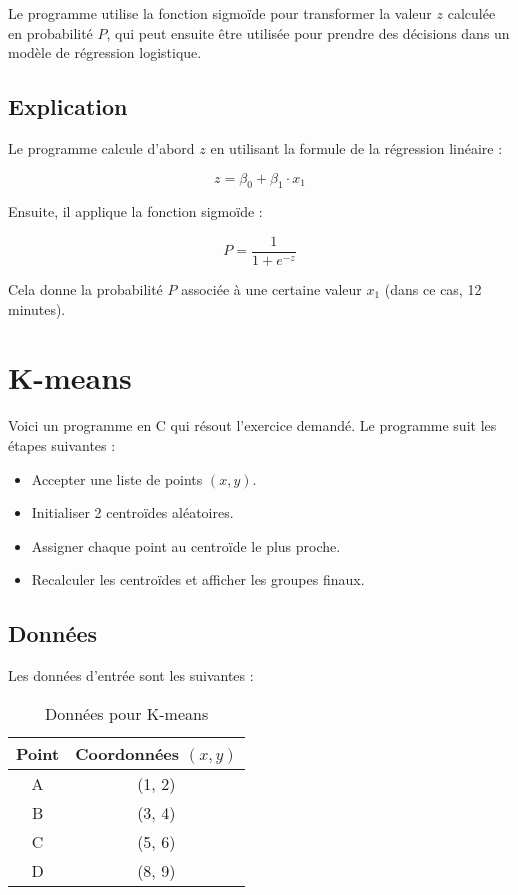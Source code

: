 Le programme utilise la fonction sigmoïde pour transformer la valeur \( z \) calculée en probabilité \( P \), qui peut ensuite être utilisée pour prendre des décisions dans un modèle de régression logistique.

\subsection*{Explication}

Le programme calcule d'abord \( z \) en utilisant la formule de la régression linéaire :

\[
z = \beta_0 + \beta_1 \cdot x_1
\]

Ensuite, il applique la fonction sigmoïde :

\[
P = \frac{1}{1 + e^{-z}}
\]

Cela donne la probabilité \( P \) associée à une certaine valeur \( x_1 \) (dans ce cas, 12 minutes).


\section*{ K-means}

Voici un programme en C qui résout l'exercice demandé. Le programme suit les étapes suivantes :
\begin{itemize}
	\item Accepter une liste de points \( (x, y) \).
	\item Initialiser 2 centroïdes aléatoires.
	\item Assigner chaque point au centroïde le plus proche.
	\item Recalculer les centroïdes et afficher les groupes finaux.
\end{itemize}

\subsection*{Données}

Les données d'entrée sont les suivantes :

\begin{table}[h]
	\centering
	\caption{Données pour K-means}
	\begin{tabular}{|c|c|}
		\hline
		Point & Coordonnées $(x, y)$ \\ \hline
		A     & (1, 2)               \\ \hline
		B     & (3, 4)               \\ \hline
		C     & (5, 6)               \\ \hline
		D     & (8, 9)               \\ \hline
	\end{tabular}
\end{table}

